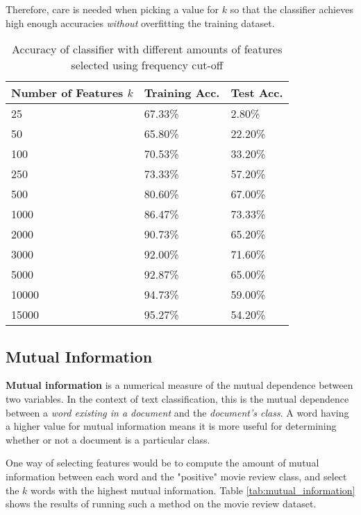 \documentclass{article}
\begin{document}
Therefore, care is needed when picking a value for $k$ so that the classifier achieves high enough accuracies \textit{without} overfitting the training dataset.

\begin{table}
	\centering
	\begin{tabular}{|l|l|l|}
	\hline
	\textbf{Number of Features $k$} & \textbf{Training Acc.} & \textbf{Test Acc.} \\
	\hline
	25 & 67.33\% & 2.80\% \\
	50 & 65.80\% & 22.20\% \\
	100 & 70.53\% & 33.20\% \\
	250 & 73.33\% & 57.20\% \\
	500 & 80.60\% & 67.00\% \\
	1000 & 86.47\% & 73.33\% \\
	2000 & 90.73\% & 65.20\% \\
	3000 & 92.00\% & 71.60\% \\
	5000 & 92.87\% & 65.00\% \\
	10000 & 94.73\% & 59.00\% \\
	15000 & 95.27\% & 54.20\% \\
	\hline
	\end{tabular}
	\caption{Accuracy of classifier with different amounts of features selected using frequency cut-off}
	\label{tab:frequency_cutoff}
\end{table}

\subsection{Mutual Information}

\textbf{Mutual information} is a numerical measure of the mutual dependence between two variables. In the context of text classification, this is the mutual dependence between a \textit{word existing in a document} and the \textit{document's class}. A word having a higher value for mutual information means it is more useful for determining whether or not a document is a particular class.

One way of selecting features would be to compute the amount of mutual information between each word and the "positive" movie review class, and select the $k$ words with the highest mutual information. Table \ref{tab:mutual_information} shows the results of running such a method on the movie review dataset. 
\end{document}
